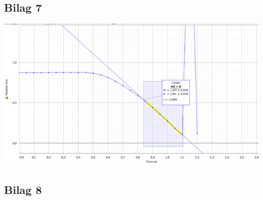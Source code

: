 \documentclass[12pt]{article}
\begin{document}
\subsection*{Bilag 7}
\begin{center}
\includegraphics[width=\linewidth]{maalthastighed.png}
\end{center}

\subsection*{Bilag 8}
\begin{center}
  
\end{center}
\end{document}
